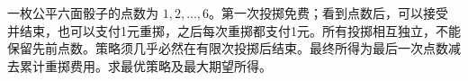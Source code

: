 一枚公平六面骰子的点数为 $1,2,\ldots,6$。第一次投掷免费；看到点数后，可以接受并结束，也可以支付1元重掷，之后每次重掷都支付1元。所有投掷相互独立，不能保留先前点数。策略须几乎必然在有限次投掷后结束。最终所得为最后一次点数减去累计重掷费用。求最优策略及最大期望所得。
